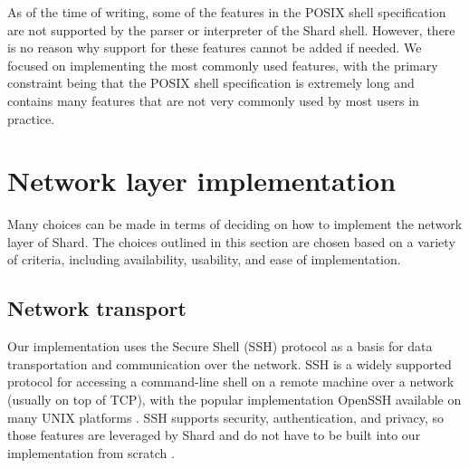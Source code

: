\documentclass[oneside]{report}
\begin{document}
As of the time of writing, some of the features in the POSIX shell specification are not supported by the parser or interpreter of the Shard shell.
However, there is no reason why support for these features cannot be added if needed.
We focused on implementing the most commonly used features, with the primary constraint being that the POSIX shell specification is extremely long and contains many features that are not very commonly used by most users in practice.

\section{Network layer implementation}


Many choices can be made in terms of deciding on how to implement the network layer of Shard.
The choices outlined in this section are chosen based on a variety of criteria, including availability, usability, and ease of implementation.

\subsection{Network transport}
Our implementation uses the Secure Shell (SSH) protocol as a basis for data transportation and communication over the network.
SSH is a widely supported protocol for accessing a command-line shell on a remote machine over a network (usually on top of TCP), with the popular implementation OpenSSH available on many UNIX platforms \cite{openssh}.
SSH supports security, authentication, and privacy, so those features are leveraged by Shard and do not have to be built into our implementation from scratch \cite{rfc4251}.
\end{document}
